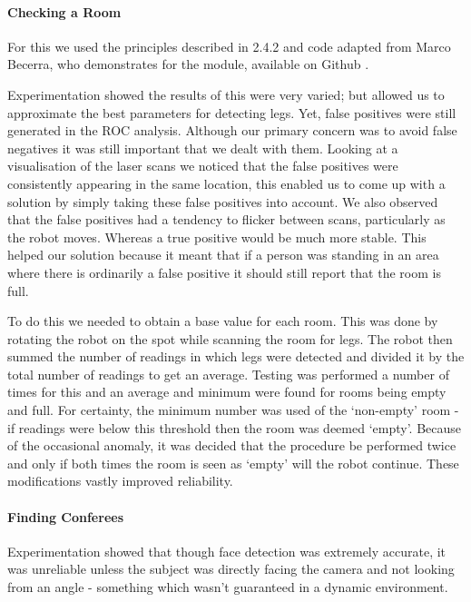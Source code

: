 \paragraph{Checking a Room}

For this we used the principles described in 2.4.2 and code adapted from Marco Becerra, who demonstrates for the module, available on Github \parencite{marco}.

Experimentation showed the results of this were very varied; but allowed us to approximate the best parameters for detecting legs. Yet, false positives were still generated in the ROC analysis. Although our primary concern was to avoid false negatives it was still important that we dealt with them. Looking at a visualisation of the laser scans we noticed that the false positives were consistently appearing in the same location, this enabled us to come up with a solution by simply taking these false positives into account. We also observed that the false positives had a tendency to flicker between scans, particularly as the robot moves. Whereas a true positive would be much more stable. This helped our solution because it meant that if a person was standing in an area where there is ordinarily a false positive it should still report that the room is full.

To do this we needed to obtain a base value for each room. This was done by rotating the robot on the spot while scanning the room for legs. The robot then summed the number of readings in which legs were detected and divided it by the total number of readings to get an average. Testing was performed a number of times for this and an average and minimum were found for rooms being empty and full. For certainty, the minimum number was used of the ‘non-empty’ room  - if readings were below this threshold then the room was deemed ‘empty’. Because of the occasional anomaly, it was decided that the procedure be performed twice and only if both times the room is seen as ‘empty’ will the robot continue. These modifications vastly improved reliability.

\paragraph{Finding Conferees}

Experimentation showed that though face detection was extremely accurate, it was unreliable unless the subject was directly facing the camera and not looking from an angle - something which wasn’t guaranteed in a dynamic environment. 

